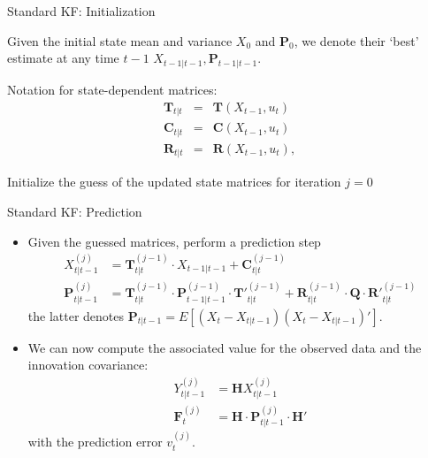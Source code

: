 \begin{frame}{Standard KF: Initialization}
\label{pkf_init}
\begin{wideitemize}
    \item Given the initial state mean and variance $X_0$ and $\mathbf{P}_0$, we denote their `best' estimate at any time $t-1$ $X_{t-1|t-1}, \mathbf{P}_{t-1|t-1}.$	
    \item Notation for state-dependent matrices: 
    \begin{eqnarray*}
    \mathbf{T}_{t|t}&=& \mathbf{T}(X_{t-1},u_{t}) \\
    \mathbf{C}_{t|t}&=& \mathbf{C}(X_{t-1},u_{t}) \\
    \mathbf{R}_{t|t} &=& \mathbf{R}(X_{t-1},u_{t}),
    \end{eqnarray*}
\item Initialize the guess of the updated state matrices for iteration $j=0$
\hyperlink{details_pkf_init}{}
\end{wideitemize}
\end{frame}

\begin{frame}{Standard KF: Prediction}
\label{details_pred_upd}
\begin{itemize}
\item Given the guessed matrices, perform a prediction step
\begin{align*}
X^{(j)}_{t|t-1}&=\mathbf{T}^{(j-1)}_{t|t}\cdot X_{t-1|t-1}+\mathbf{C}^{(j-1)}_{t|t} \\
\mathbf{P}^{(j)}_{t|t-1}&=\mathbf{T}^{(j-1)}_{t|t}\cdot \mathbf{P}_{t-1|t-1}^{(j-1)}\cdot\mathbf{T'}^{(j-1)}_{t|t} +\mathbf{R}^{(j-1)}_{t|t}\cdot \mathbf{Q}\cdot
\mathbf{R'}^{(j-1)}_{t|t}
\end{align*}
the latter denotes $\mathbf{P}_{t|t-1} = E\left[\left(X_t-X_{t|t-1}\right)\left(X_t-X_{t|t-1}\right)'\right]$.
\item We can now compute the associated value for the observed data and the innovation covariance:
\begin{align*}
Y^{(j)}_{t|t-1}&=\mathbf{H} X^{(j)}_{t|t-1}\\
\mathbf{F}^{(j)}_{t}&=\mathbf{H}\cdot \mathbf{P}^{(j)}_{t|t-1}\cdot \mathbf{H}'
\end{align*}
with the prediction error $v^{(j)}_{t}$.
\end{itemize}
\end{frame}

